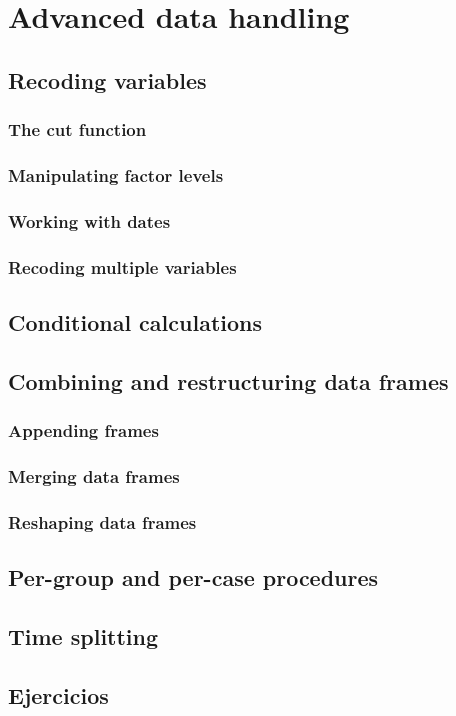 \chapter{Advanced data handling}
\section{Recoding variables}
\subsection{The cut function}
\subsection{Manipulating factor levels}
\subsection{Working with dates}
\subsection{Recoding multiple variables}
\section{Conditional calculations}
\section{Combining and restructuring data frames}
\subsection{Appending frames} \label{appending frames}
\subsection{Merging data frames}
\subsection{Reshaping data frames}
\section{Per-group and per-case procedures}
\section{Time splitting}
\section{Ejercicios}
